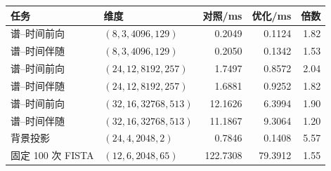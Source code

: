 \setlength{\tabcolsep}{4pt}
\begin{tabular}{p{.26\linewidth}p{.25\linewidth}rrr}\toprule
任务 & 维度 & 对照/ms & 优化/ms & 倍数\\\midrule
谱--时间前向 & $(8,3,4096,129)$ & 0.2049 & 0.1124 & 1.82\\
谱--时间伴随 & $(8,3,4096,129)$ & 0.2050 & 0.1342 & 1.53\\
谱--时间前向 & $(24,12,8192,257)$ & 1.7497 & 0.8572 & 2.04\\
谱--时间伴随 & $(24,12,8192,257)$ & 1.6881 & 0.9252 & 1.82\\
谱--时间前向 & $(32,16,32768,513)$ & 12.1626 & 6.3994 & 1.90\\
谱--时间伴随 & $(32,16,32768,513)$ & 11.1867 & 9.3064 & 1.20\\
背景投影 & $(24,4,2048,2)$ & 0.7846 & 0.1408 & 5.57\\
固定 100 次 FISTA & $(12,6,2048,65)$ & 122.7308 & 79.3912 & 1.55\\
\bottomrule\end{tabular}
